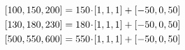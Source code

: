 \documentclass[preview]{standalone}
\begin{document}
\begin{align*}
\special{dvisvgm:raw <g id='unique000'>}[100,150,200] &= 150\!\cdot\![1,1,1] + [-50,0,50]\\ \special{dvisvgm:raw </g>}\special{dvisvgm:raw <g id='unique001'>}[130,180,230] &= 180\!\cdot\![1,1,1] + [-50,0,50]\\ \special{dvisvgm:raw </g>}\special{dvisvgm:raw <g id='unique002'>}[500,550,600] &= 550\!\cdot\![1,1,1] + [-50,0,50]\special{dvisvgm:raw </g>}
\end{align*}
\end{document}
